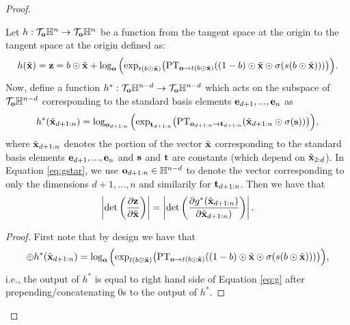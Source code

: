 \begin{proof}
\begin{lemma}
Let $h : \mathcal{T}_{\mathbf{o}}\mathbb{H}^n \rightarrow \mathcal{T}_{\mathbf{o}}\mathbb{H}^n$ be a function from the tangent space at the origin to the tangent space at the origin defined as:
\begin{equation}\label{eq:g}
h(\tilde{\mathbf{x}}) = \mathbf{z} = b \odot \tilde{
    \mathbf{x}} + \log_{\textbf{o}}\Big( \textnormal{exp}_{t(b \odot \tilde{\mathbf{x}})}\big(\textnormal{PT}_{\textbf{o}\to t(b \odot \tilde{\mathbf{x}}) }((1-b) \odot \tilde{\mathbf{x}} \odot \sigma(s(b \odot \tilde{\mathbf{x}})))\big)\Big).
\end{equation}
Now, define a function $h^* : \mathcal{T}_{\mathbf{o}}\mathbb{H}^{n-d} \rightarrow \mathcal{T}_{\mathbf{o}}\mathbb{H}^{n-d}$ which acts on the subspace of $\mathcal{T}_{\mathbf{o}}\mathbb{H}^{n-d}$ corresponding to the standard basis elements $\mathbf{e}_{d+1}, ..., \mathbf{e}_n$ as
\begin{equation}\label{eq:gstar}
h^*(\tilde{\mathbf{x}}_{d+1:n}) =   \log_{\mathbf{o}_{d+1:n}}\Big( \textnormal{exp}_{\mathbf{t}_{d+1:n}}\big(\textnormal{PT}_{\mathbf{o}_{d+1:n} \to \mathbf{t}_{d+1:n}}( \tilde{\mathbf{x}}_{d+1:n} \odot \sigma(\mathbf{s}))\big)\Big),
\end{equation}
where $\tilde{\mathbf{x}}_{d+1:n}$ denotes the portion of the vector $\tilde{\mathbf{x}}$ corresponding to the standard basis elements $\mathbf{e}_{d+1}, ..., \mathbf{e}_n$ and $\mathbf{s}$ and $\mathbf{t}$ are constants (which depend on $\tilde{\mathbf{x}}_{2:d}$).
In Equation \eqref{eq:gstar}, we use $\mathbf{o}_{d+1:n} \in \mathbb{H}^{n-d}$ to denote the vector corresponding to only the dimensions $d+1, ..., n$ and similarily for $\mathbf{t}_{d+1:n}$.
Then we have that
\begin{equation}
    \left|\textnormal{det}\left(\frac{\partial \mathbf{z}}{\partial \tilde{\mathbf{x}}}\right)\right| =    \left|\textnormal{det}\left(\frac{\partial g^*(\tilde{\mathbf{x}}_{d+1:n})}{\partial \tilde{\mathbf{x}}_{d+1:n})}\right)\right|.
\end{equation}
\end{lemma}
\begin{proof}
First note that by design we have that 
\begin{equation}
    [0,0..,0] \oplus h^*(\tildex_{d+1:n}) = \log_{\textbf{o}}\Big( \textnormal{exp}_{t(b \odot \tilde{\mb{x}})}\big(\textnormal{PT}_{\textbf{o}\to t(b \odot \tilde{\mb{x}}) }((1-b) \odot \tilde{\mb{x}} \odot \sigma(s(b \odot \tildex)))\big)\Big),
\end{equation}
i.e., the output of $h^*$ is equal to right hand side of Equation \eqref{eq:g} after prepending/concatenating 0s to the output of $h^*$. 


\end{proof}
\end{proof}

